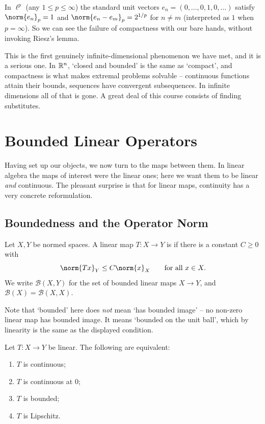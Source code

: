 \documentclass[a4paper]{scrartcl}
\newcommand{\Bop}{\mathcal{B}}
\begin{document}
\begin{example}
	In $\ell^p$ (any $1 \leq p \leq \infty$) the standard unit vectors $e_n = (0, \dots, 0, 1, 0, \dots)$ satisfy $\norm{e_n}_p = 1$ and $\norm{e_n - e_m}_p = 2^{1/p}$ for $n \neq m$ (interpreted as $1$ when $p = \infty$). So we can see the failure of compactness with our bare hands, without invoking Riesz's lemma.
\end{example}

This is the first genuinely infinite-dimensional phenomenon we have met, and it is a serious one. In $\mathbb{R}^n$, `closed and bounded' is the same as `compact', and compactness is what makes extremal problems solvable -- continuous functions attain their bounds, sequences have convergent subsequences. In infinite dimensions all of that is gone. A great deal of this course consists of finding substitutes.

\section{Bounded Linear Operators}

Having set up our objects, we now turn to the maps between them. In linear algebra the maps of interest were the linear ones; here we want them to be linear \emph{and} continuous. The pleasant surprise is that for linear maps, continuity has a very concrete reformulation.

\subsection{Boundedness and the Operator Norm}

\begin{definition}
	Let $X, Y$ be normed spaces. A linear map $T : X \to Y$ is  if there is a constant $C \geq 0$ with
	$$\norm{Tx}_Y \leq C \norm{x}_X \qquad \text{for all } x \in X.$$
	We write $\Bop(X,Y)$ for the set of bounded linear maps $X \to Y$, and $\Bop(X) = \Bop(X,X)$.
\end{definition}

Note that `bounded' here does \emph{not} mean `has bounded image' -- no non-zero linear map has bounded image. It means `bounded on the unit ball', which by linearity is the same as the displayed condition.

\begin{proposition}
	Let $T : X \to Y$ be linear. The following are equivalent:
	\begin{enumerate}[label=(\roman*)]
		\item $T$ is continuous;
		\item $T$ is continuous at $0$;
		\item $T$ is bounded;
		\item $T$ is Lipschitz.
	\end{enumerate}
\end{proposition}
\end{document}
